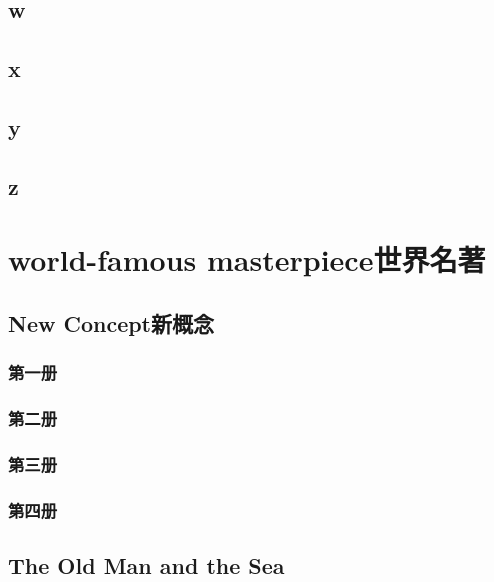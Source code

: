 \documentclass[12pt,twiside,a4paper]{ctexbook}
\numberwithin{chapter}{part}
\begin{document}
\section{w}
\section{x}
\section{y}
\section{z}

\chapter{world-famous masterpiece世界名著}
\section{New Concept新概念}
\subsection{第一册}
\subsection{第二册}
\subsection{第三册}
\subsection{第四册}
\section{The Old Man and the Sea}
\end{document}
